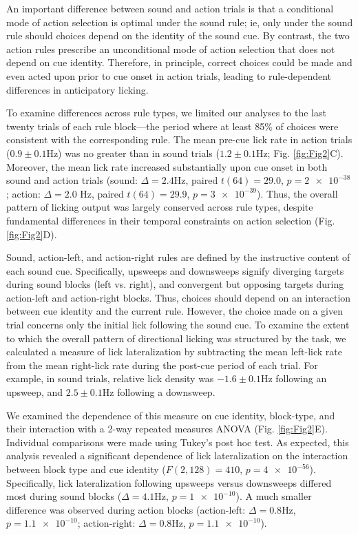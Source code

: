 

An important difference between sound and action trials is that a conditional mode of action selection \citep{mitz91} is optimal under the sound rule; ie, only under the sound rule should choices depend on the identity of the sound cue. By contrast, the two action rules prescribe an unconditional mode of action selection that does not depend on cue identity. Therefore, in principle, correct choices could be made and even acted upon prior to cue onset in action trials, leading to rule-dependent differences in anticipatory licking.

To examine differences across rule types, we limited our analyses to the last twenty trials of each rule block---the period where at least 85$\%$  of choices were consistent with the corresponding rule. The mean pre-cue lick rate in action trials ($0.9 \pm 0.1$Hz) was no greater than in sound trials ($1.2 \pm 0.1$Hz; Fig. \ref{fig:Fig2}C). Moreover, the mean lick rate increased substantially upon cue onset in both sound and action trials (sound: $\Delta=2.4$Hz, paired $t(64) =29.0$, $p=\num{2e-38}$; action: $\Delta=2.0$ Hz, paired $t(64)=29.9$, $p=\num{3e-39}$). Thus, the overall pattern of licking output was largely conserved across rule types, despite fundamental differences in their temporal constraints on action selection (Fig. \ref{fig:Fig2}D).

Sound, action-left, and action-right rules are defined by the instructive content of each sound cue. Specifically, upsweeps and downsweeps signify diverging targets during sound blocks (left vs. right), and convergent but opposing targets during action-left and action-right blocks. Thus, choices should depend on an interaction between cue identity and the current rule. However, the choice made on a given trial concerns only the initial lick following the sound cue. To examine the extent to which the overall pattern of directional licking was structured by the task, we calculated a measure of lick lateralization by subtracting the mean left-lick rate from the mean right-lick rate during the post-cue period of each trial. For example, in sound trials, relative lick density was $-1.6 \pm 0.1$Hz following an upsweep, and $2.5 \pm 0.1$Hz following a downsweep.

We examined the dependence of this measure on cue identity, block-type, and their interaction with a 2-way repeated measures ANOVA  (Fig. \ref{fig:Fig2}E). Individual comparisons were made using Tukey’s post hoc test. As expected, this analysis revealed a significant dependence of lick lateralization on the interaction between block type and cue identity ($F(2,128)=410$, $p=\num{4e-56}$). Specifically, lick lateralization following upsweeps versus downsweeps differed most during sound blocks ($\Delta=4.1$Hz, $p=\num{1e-10}$). A much smaller difference was observed during action blocks (action-left: $\Delta=0.8$Hz, $p=\num{1.1e-10}$; action-right: $\Delta=0.8$Hz, $p=\num{1.1e-10}$). 

